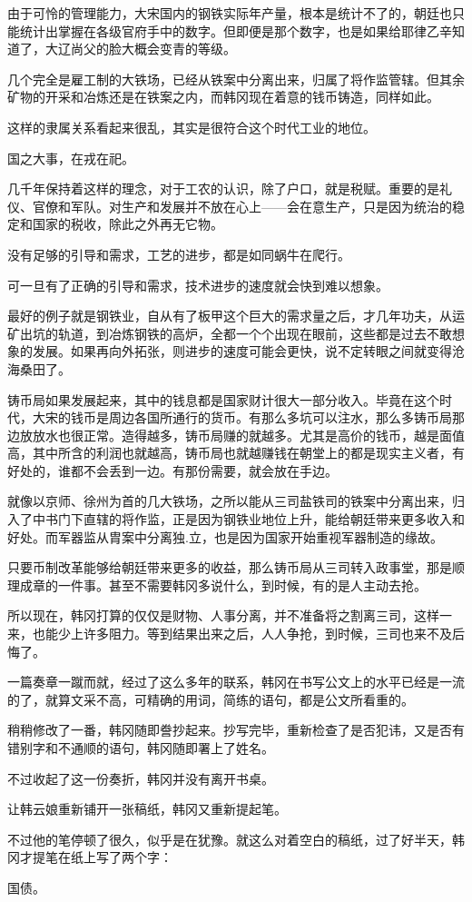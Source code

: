 由于可怜的管理能力，大宋国内的钢铁实际年产量，根本是统计不了的，朝廷也只能统计出掌握在各级官府手中的数字。但即便是那个数字，也是如果给耶律乙辛知道了，大辽尚父的脸大概会变青的等级。

几个完全是雇工制的大铁场，已经从铁案中分离出来，归属了将作监管辖。但其余矿物的开采和冶炼还是在铁案之内，而韩冈现在着意的钱币铸造，同样如此。

这样的隶属关系看起来很乱，其实是很符合这个时代工业的地位。

国之大事，在戎在祀。

几千年保持着这样的理念，对于工农的认识，除了户口，就是税赋。重要的是礼仪、官僚和军队。对生产和发展并不放在心上——会在意生产，只是因为统治的稳定和国家的税收，除此之外再无它物。

没有足够的引导和需求，工艺的进步，都是如同蜗牛在爬行。

可一旦有了正确的引导和需求，技术进步的速度就会快到难以想象。

最好的例子就是钢铁业，自从有了板甲这个巨大的需求量之后，才几年功夫，从运矿出坑的轨道，到冶炼钢铁的高炉，全都一个个出现在眼前，这些都是过去不敢想象的发展。如果再向外拓张，则进步的速度可能会更快，说不定转眼之间就变得沧海桑田了。

铸币局如果发展起来，其中的钱息都是国家财计很大一部分收入。毕竟在这个时代，大宋的钱币是周边各国所通行的货币。有那么多坑可以注水，那么多铸币局那边放放水也很正常。造得越多，铸币局赚的就越多。尤其是高价的钱币，越是面值高，其中所含的利润也就越高，铸币局也就越赚钱在朝堂上的都是现实主义者，有好处的，谁都不会丢到一边。有那份需要，就会放在手边。

就像以京师、徐州为首的几大铁场，之所以能从三司盐铁司的铁案中分离出来，归入了中书门下直辖的将作监，正是因为钢铁业地位上升，能给朝廷带来更多收入和好处。而军器监从胄案中分离独.立，也是因为国家开始重视军器制造的缘故。

只要币制改革能够给朝廷带来更多的收益，那么铸币局从三司转入政事堂，那是顺理成章的一件事。甚至不需要韩冈多说什么，到时候，有的是人主动去抢。

所以现在，韩冈打算的仅仅是财物、人事分离，并不准备将之割离三司，这样一来，也能少上许多阻力。等到结果出来之后，人人争抢，到时候，三司也来不及后悔了。

一篇奏章一蹴而就，经过了这么多年的联系，韩冈在书写公文上的水平已经是一流的了，就算文采不高，可精确的用词，简练的语句，都是公文所看重的。

稍稍修改了一番，韩冈随即誊抄起来。抄写完毕，重新检查了是否犯讳，又是否有错别字和不通顺的语句，韩冈随即署上了姓名。

不过收起了这一份奏折，韩冈并没有离开书桌。

让韩云娘重新铺开一张稿纸，韩冈又重新提起笔。

不过他的笔停顿了很久，似乎是在犹豫。就这么对着空白的稿纸，过了好半天，韩冈才提笔在纸上写了两个字：

国债。


